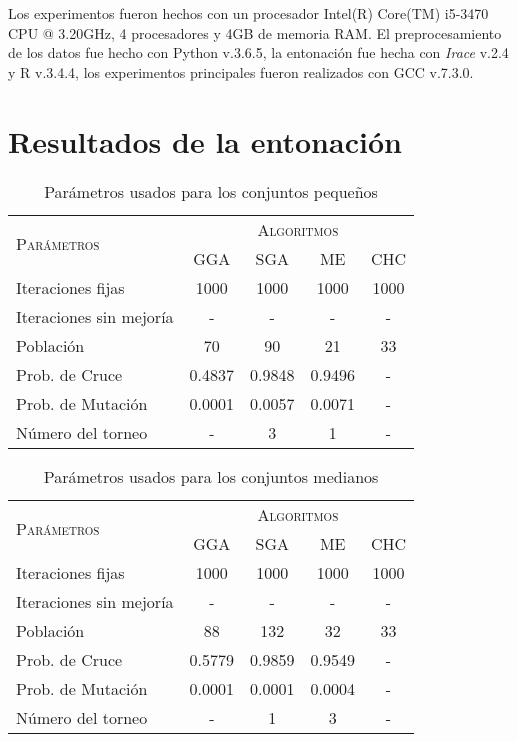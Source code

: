 Los experimentos fueron hechos con un procesador Intel(R) Core(TM) i5-3470 CPU @ 3.20GHz, 4 procesadores y 4GB de memoria RAM. El preprocesamiento de los datos fue hecho con Python v.3.6.5, la entonación fue hecha con \emph{Irace} v.2.4 y R v.3.4.4, los experimentos principales fueron realizados con GCC v.7.3.0.

\section{Resultados de la entonación}

\begin{table}[]
\centering
\begin{tabular}{l c c c c}
\hline
\multirow{2}{*}{\textsc{Parámetros}}
	& \multicolumn{4}{c}{\textsc{Algoritmos}} \\
	& GGA & SGA & ME & CHC \\
\hline
\hline
Iteraciones fijas       &  1000    &  1000    &  1000      &  1000 \\
Iteraciones sin mejoría &    -     &    -     &    -       &    -  \\
Población               &    70    &    90    &    21      &    33 \\
Prob. de Cruce          &   0.4837 &   0.9848 &     0.9496 &     - \\
Prob. de Mutación       &   0.0001 &  0.0057  &     0.0071 &     - \\
Número del torneo       &   -      &    3     &     1      &     - \\
\hline
\end{tabular}
\caption{Parámetros usados para los conjuntos pequeños}
\label{param-peq}
\end{table}


\begin{table}[]
\centering
\begin{tabular}{l c c c c}
\hline
\multirow{2}{*}{\textsc{Parámetros}}
	& \multicolumn{4}{c}{\textsc{Algoritmos}} \\
	& GGA & SGA & ME & CHC \\
\hline
\hline
Iteraciones fijas       &  1000    &  1000    &  1000      &  1000 \\
Iteraciones sin mejoría &    -     &    -     &    -       &    -  \\
Población               &    88    &    132   &    32      &    33 \\
Prob. de Cruce          &   0.5779 &   0.9859 &     0.9549 &     - \\
Prob. de Mutación       &   0.0001 &  0.0001  &     0.0004 &     - \\
Número del torneo       &   -      &    1     &     3      &     - \\
\hline
\end{tabular}
\caption{Parámetros usados para los conjuntos medianos}
\label{param-med}
\end{table}